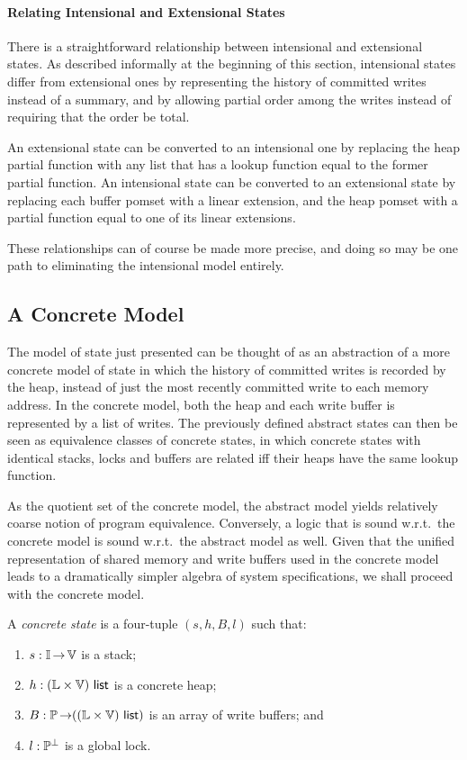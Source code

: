 \documentclass[11pt]{article}
\begin{document}
\paragraph{Relating Intensional and Extensional States} There is a straightforward relationship between intensional and extensional states. As described informally at the beginning of this section, intensional states differ from extensional ones by representing the history of committed writes  instead of a summary, and by allowing partial order among the writes instead of requiring that the order be total. 

An extensional state can be converted to an intensional one by replacing the heap partial function with any list that has a lookup function equal to the former partial function. An intensional state can be converted to an extensional state by replacing each buffer pomset with a linear extension, and the heap pomset with a partial function equal to one of its linear extensions. 

These relationships can of course be made more precise, and doing so may be one path to eliminating the intensional model entirely.  

\subsection{A Concrete Model}

The model of state just presented can be thought of as an abstraction of a more concrete model of state in which the history of committed writes is recorded by the heap, instead of just the most recently committed write to each memory address. In the concrete model, both the heap and each write buffer is represented by a list of writes. The previously defined abstract states can then be seen as equivalence classes of concrete states, in which concrete states with identical stacks, locks and buffers are related iff their heaps have the same lookup function. 

As the quotient set of the concrete model, the abstract model yields relatively coarse notion of program equivalence. Conversely, a logic that is sound w.r.t.\ the concrete model is sound w.r.t.\ the abstract model as well. Given that the unified representation of shared memory and write buffers used in the concrete model leads to a dramatically simpler algebra of system specifications, we shall proceed with the concrete model. 

A \emph{concrete state} is a four-tuple $(s,h,B,l)$ such that: \begin{enumerate}
	\item $s : \mathbb{I} \operatorname{\rightarrow} \mathbb{V}$ is a stack;
	\item $h : (\mathbb{L} \times \mathbb{V})~\mathsf{list}$ is a concrete heap; 
	\item $B : \mathbb{P} \operatorname{\rightarrow} ((\mathbb{L} \times \mathbb{V})~\mathsf{list})$ is an array of write buffers; and 
	\item $l : \mathbb{P}^\bot$ is a global lock. 
\end{enumerate}  
\end{document}
